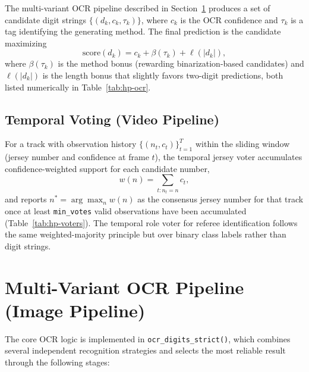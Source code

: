 The multi-variant OCR pipeline described in
Section~\ref{sec:multi-variant-ocr} produces a set of candidate digit
strings $\{(d_k, c_k, \tau_k)\}$, where $c_k$ is the OCR confidence and
$\tau_k$ is a tag identifying the generating method. The final
prediction is the candidate maximizing
\begin{equation}
    \text{score}(d_k) = c_k + \beta(\tau_k) + \ell(|d_k|),
    \label{eq:ocr-score}
\end{equation}
where $\beta(\tau_k)$ is the method bonus (rewarding
binarization-based candidates) and $\ell(|d_k|)$ is the length bonus
that slightly favors two-digit predictions, both listed numerically in
Table~\ref{tab:hp-ocr}.

\subsection{Temporal Voting (Video Pipeline)}

For a track with observation history $\{(n_t, c_t)\}_{t=1}^{T}$ within
the sliding window (jersey number and confidence at frame $t$), the
temporal jersey voter accumulates confidence-weighted support for each
candidate number,
\begin{equation}
    w(n) = \sum_{t : n_t = n} c_t,
    \label{eq:temporal-vote}
\end{equation}
and reports $n^{*} = \arg\max_n w(n)$ as the consensus jersey number for
that track once at least \texttt{min\_votes} valid observations have
been accumulated (Table~\ref{tab:hp-voters}). The temporal role voter
for referee identification follows the same weighted-majority principle
but over binary class labels rather than digit strings.

\section{Multi-Variant OCR Pipeline (Image Pipeline)}
\label{sec:multi-variant-ocr}

The core OCR logic is implemented in \texttt{ocr\_digits\_strict()},
which combines several independent recognition strategies and selects the
most reliable result through the following stages:

